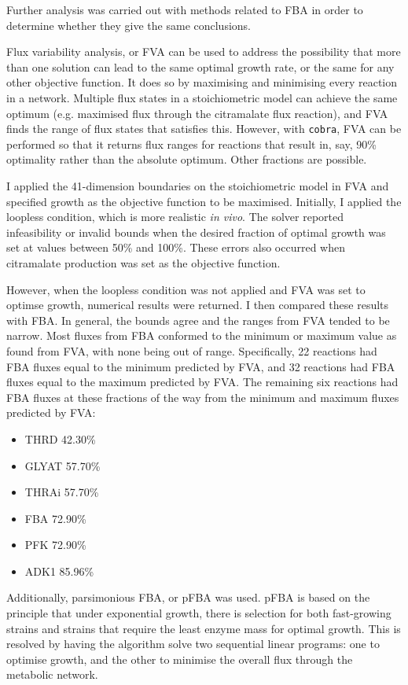 \documentclass[parskip=full, numbers=noenddot]{scrreprt}
\begin{document}
Further analysis was carried out with methods related to FBA in order to determine whether they give the same conclusions.

Flux variability analysis, or FVA \citep{orth_what_2010} can be used to address the possibility that more than one solution can lead to the same optimal growth rate, or the same for any other objective function. It does so by maximising and minimising every reaction in a network.
Multiple flux states in a stoichiometric model can achieve the same optimum (e.g. maximised flux through the citramalate flux reaction), and FVA finds the range of flux states that satisfies this. However, with \texttt{cobra}, FVA can be performed so that it returns flux ranges for reactions that result in, say, 90\% optimality rather than the absolute optimum. Other fractions are possible.

I applied the 41-dimension boundaries on the stoichiometric model in FVA and specified growth as the objective function to be maximised. Initially, I applied the loopless condition, which is more realistic \emph{in vivo}. The solver reported infeasibility or invalid bounds when the desired fraction of optimal growth was set at values between 50\% and 100\%. These errors also occurred when citramalate production was set as the objective function.

However, when the loopless condition was not applied and FVA was set to optimse growth, numerical results were returned.
I then compared these results with FBA. In general, the bounds agree and the ranges from FVA tended to be narrow. Most fluxes from FBA conformed to the minimum or maximum value as found from FVA, with none being out of range. Specifically, 22 reactions had FBA fluxes equal to the minimum predicted by FVA, and 32 reactions had FBA fluxes equal to the maximum predicted by FVA. The remaining six reactions had FBA fluxes at these fractions of the way from the minimum and maximum fluxes predicted by FVA:
\begin{itemize}
\item THRD 42.30\%
\item GLYAT 57.70\%
\item THRAi 57.70\%
\item FBA 72.90\%
\item PFK 72.90\%
  \item ADK1 85.96\%
  \end{itemize}

  Additionally, parsimonious FBA, or pFBA \citep{lewis_omic_2010} was used. pFBA is based on the principle that under exponential growth, there is selection for both fast-growing strains and strains that require the least enzyme mass for optimal growth. This is resolved by having the algorithm solve two sequential linear programs: one to optimise growth, and the other to minimise the overall flux through the metabolic network.
\end{document}
